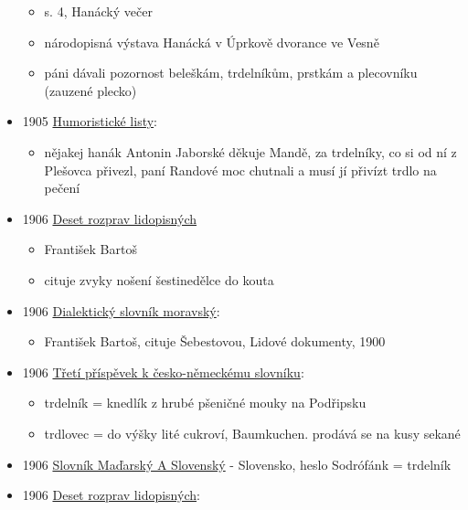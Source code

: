 \begin{itemize}
  \begin{itemize}
  \tightlist
  \item
    s. 4, Hanácký večer
  \item
    národopisná výstava Hanácká v Úprkově dvorance ve Vesně
  \item
    páni dávali pozornost beleškám, trdelníkům, prstkám a plecovníku
    (zauzené plecko)
  \end{itemize}
\item
  1905
  \href{https://ceskadigitalniknihovna.cz/uuid/uuid:e6cc2207-435d-11dd-b505-00145e5790ea}{Humoristické
  listy}:

  \begin{itemize}
  \tightlist
  \item
    nějakej hanák Antonin Jaborské děkuje Mandě, za trdelníky, co si od
    ní z Plešovca přivezl, paní Randové moc chutnali a musí jí přivízt
    trdlo na pečení
  \end{itemize}
\item
  1906
  \href{https://ceskadigitalniknihovna.cz/uuid/uuid:50b3ac32-1b3f-4639-9f61-c01f3883690d}{Deset
  rozprav lidopisných}

  \begin{itemize}
  \tightlist
  \item
    František Bartoš
  \item
    cituje zvyky nošení šestinedělce do kouta
  \end{itemize}
\item
  1906
  \href{https://ceskadigitalniknihovna.cz/view/uuid:d04052b0-a08e-11ed-bf61-5ef3fc9bb22f?page=uuid:50e42324-813b-4538-aaf5-2b1efbf63513&fulltext=trd*ln*k*&source=nkp}{Dialektický
  slovník moravský}:

  \begin{itemize}
  \tightlist
  \item
    František Bartoš, cituje Šebestovou, Lidové dokumenty, 1900
  \end{itemize}
\item
  1906
  \href{https://ndk.cz/uuid/uuid:6a5d3470-e943-11e2-9923-005056827e52}{Třetí
  příspěvek k česko-německému slovníku}:

  \begin{itemize}
  \tightlist
  \item
    trdelník = knedlík z hrubé pšeničné mouky na Podřipsku
  \item
    trdlovec = do výšky lité cukroví, Baumkuchen. prodává se na kusy
    sekané
  \end{itemize}
\item
  1906
  \href{https://dikda.snk.sk/view/uuid:a5d481cd-45e0-4830-8eb3-f6a70599c799?page=uuid:400792a6-389c-46bb-9b66-3bd44ddecca3&fulltext=trdeln\%C3\%ADk\%20OR\%20trdeln\%C3\%ADka\%20OR\%20trdeln\%C3\%ADku}{Slovník
  Maďarský A Slovenský} - Slovensko, heslo Sodrófánk = trdelník
\item
  1906
  \href{https://ceskadigitalniknihovna.cz/view/uuid:50b3ac32-1b3f-4639-9f61-c01f3883690d?page=uuid:ad4dfae7-7a29-11ed-b508-001b63bd97ba&fulltext=trdeln\%C3\%ADky&source=kfbz}{Deset
  rozprav lidopisných}:


\end{itemize}
